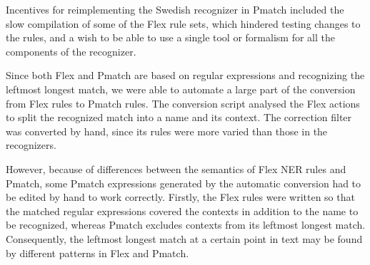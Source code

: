 \documentclass{llncs}
\begin{document}
Incentives for reimplementing the Swedish recognizer in Pmatch
included the slow compilation of some of the Flex rule sets, which
hindered testing changes to the rules, and a
wish to be able to use a single tool or
formalism for all the components of the recognizer.

Since both Flex and Pmatch are based on regular expressions and
recognizing the leftmost longest match, we were able to automate a
large part of the conversion from Flex rules to Pmatch rules. The
conversion script analysed the Flex actions to split the recognized
match into a name and its context. The correction filter was converted
by hand, since its rules were more varied than those in the
recognizers.


However, because of differences between the semantics of Flex NER
rules and Pmatch, some Pmatch expressions generated by the automatic
conversion had to be edited by hand to work correctly. Firstly, the
Flex rules were written so that the matched regular expressions covered
the contexts in addition to the name to be recognized, whereas Pmatch
excludes contexts from its leftmost longest match. Consequently, the
leftmost longest match at a certain point in text may be found by
different patterns in Flex and Pmatch.

\end{document}
